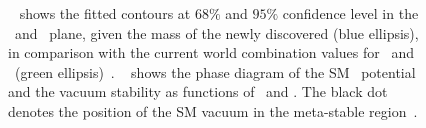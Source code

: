 \begin{figure}[tbp!]
\centering
{}
\caption[Implications of the top quark mass]{
\Fig~ shows the fitted contours at $68\%$ and $95\%$ confidence level in the \mt\ and \mW\ plane, given the mass of the newly discovered \Hboson (blue ellipsis), in comparison with the current world combination values for \mt\ and \mW\ (green ellipsis)~\cite{Baak2014}.
%
\Fig~ shows the phase diagram of the \gls{SM} \Hboson\ potential and the vacuum stability as functions of \mt\ and \mH. The black dot denotes the position of the \gls{SM} vacuum in the meta-stable region~\cite{Degrassi2012}.
%
\label{fig:toprole}}
\end{figure}










